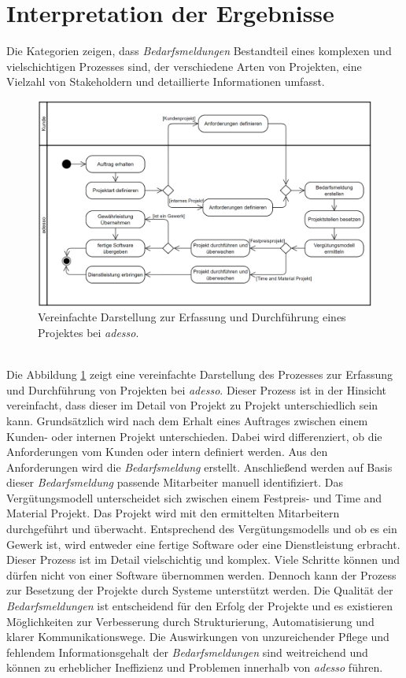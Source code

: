 \section{Interpretation der Ergebnisse}
Die Kategorien zeigen, dass \emph{Bedarfsmeldungen} Bestandteil eines komplexen und vielschichtigen Prozesses sind, der verschiedene Arten von Projekten, eine Vielzahl von Stakeholdern und detaillierte Informationen umfasst. 
\begin{figure}[h]%
	\centering  
	\includegraphics[scale=0.8]{Abbildungen/bedarfsmeldungsprozess.png}
	\caption{Vereinfachte Darstellung zur Erfassung und Durchführung eines Projektes bei \emph{adesso}.}
	\label{fig:bedarfsmeldungsprozess}
\end{figure}\mbox{} \\
Die Abbildung \ref{fig:bedarfsmeldungsprozess} zeigt eine vereinfachte Darstellung des Prozesses zur Erfassung und Durchführung von Projekten bei \emph{adesso}. Dieser Prozess ist in der Hinsicht vereinfacht, dass dieser im Detail von Projekt zu Projekt unterschiedlich sein kann. Grundsätzlich wird nach dem Erhalt eines Auftrages zwischen einem Kunden- oder internen Projekt unterschieden. Dabei wird differenziert, ob die Anforderungen vom Kunden oder intern definiert werden. Aus den Anforderungen wird die \emph{Bedarfsmeldung} erstellt. Anschließend werden auf Basis dieser \emph{Bedarfsmeldung} passende Mitarbeiter manuell identifiziert. Das Vergütungsmodell unterscheidet sich zwischen einem Festpreis- und Time and Material Projekt. Das Projekt wird mit den ermittelten Mitarbeitern durchgeführt und überwacht. Entsprechend des Vergütungsmodells und ob es ein Gewerk ist, wird entweder eine fertige Software oder eine Dienstleistung erbracht. Dieser Prozess ist im Detail vielschichtig und komplex. Viele Schritte können und dürfen nicht von einer Software übernommen werden. Dennoch kann der Prozess zur Besetzung der Projekte durch Systeme unterstützt werden. Die Qualität der \emph{Bedarfsmeldungen} ist entscheidend für den Erfolg der Projekte und es existieren Möglichkeiten zur Verbesserung durch Strukturierung, Automatisierung und klarer Kommunikationswege. Die Auswirkungen von unzureichender Pflege und fehlendem Informationsgehalt der \emph{Bedarfsmeldungen} sind weitreichend und können zu erheblicher Ineffizienz und Problemen innerhalb von \emph{adesso} führen.
